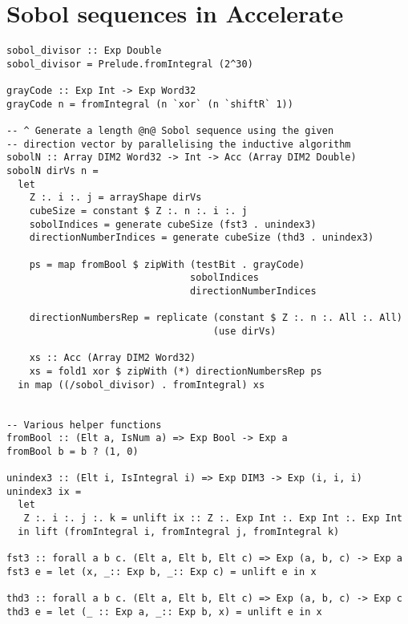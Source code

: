 \chapter{Sobol sequences in Accelerate}
\label{appendix:accelerate-sobol}

\begin{lstlisting}sobol_divisor :: Exp Double
sobol_divisor = Prelude.fromIntegral (2^30)

grayCode :: Exp Int -> Exp Word32
grayCode n = fromIntegral (n `xor` (n `shiftR` 1))

-- ^ Generate a length @n@ Sobol sequence using the given
-- direction vector by parallelising the inductive algorithm
sobolN :: Array DIM2 Word32 -> Int -> Acc (Array DIM2 Double)
sobolN dirVs n =
  let
    Z :. i :. j = arrayShape dirVs
    cubeSize = constant $ Z :. n :. i :. j
    sobolIndices = generate cubeSize (fst3 . unindex3)
    directionNumberIndices = generate cubeSize (thd3 . unindex3)

    ps = map fromBool $ zipWith (testBit . grayCode)
                                sobolIndices
                                directionNumberIndices

    directionNumbersRep = replicate (constant $ Z :. n :. All :. All) 
                                    (use dirVs)

    xs :: Acc (Array DIM2 Word32)
    xs = fold1 xor $ zipWith (*) directionNumbersRep ps
  in map ((/sobol_divisor) . fromIntegral) xs


-- Various helper functions
fromBool :: (Elt a, IsNum a) => Exp Bool -> Exp a
fromBool b = b ? (1, 0)

unindex3 :: (Elt i, IsIntegral i) => Exp DIM3 -> Exp (i, i, i)
unindex3 ix =
  let
   Z :. i :. j :. k = unlift ix :: Z :. Exp Int :. Exp Int :. Exp Int
  in lift (fromIntegral i, fromIntegral j, fromIntegral k)

fst3 :: forall a b c. (Elt a, Elt b, Elt c) => Exp (a, b, c) -> Exp a
fst3 e = let (x, _:: Exp b, _:: Exp c) = unlift e in x

thd3 :: forall a b c. (Elt a, Elt b, Elt c) => Exp (a, b, c) -> Exp c
thd3 e = let (_ :: Exp a, _:: Exp b, x) = unlift e in x
\end{lstlisting}
